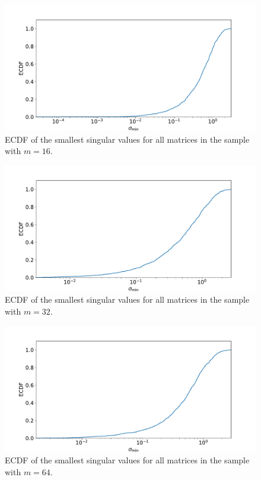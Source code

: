 \documentclass[a4paper, 11pt]{article}
\begin{document}
\begin{figure}
  \centering
  \includegraphics[width=\textwidth]{../2/square_ecdf/16.pdf}
  \caption{ECDF of the smallest singular values for all matrices in the sample with $m=16$.}
  \label{fig:sigma_min_ECDF_16}
\end{figure}
\begin{figure}
  \centering
  \includegraphics[width=\textwidth]{../2/square_ecdf/32.pdf}
  \caption{ECDF of the smallest singular values for all matrices in the sample with $m=32$.}
  \label{fig:sigma_min_ECDF_32}
\end{figure}
\begin{figure}
  \centering
  \includegraphics[width=\textwidth]{../2/square_ecdf/64.pdf}
  \caption{ECDF of the smallest singular values for all matrices in the sample with $m=64$.}
  \label{fig:sigma_min_ECDF_64}
\end{figure}
\end{document}
